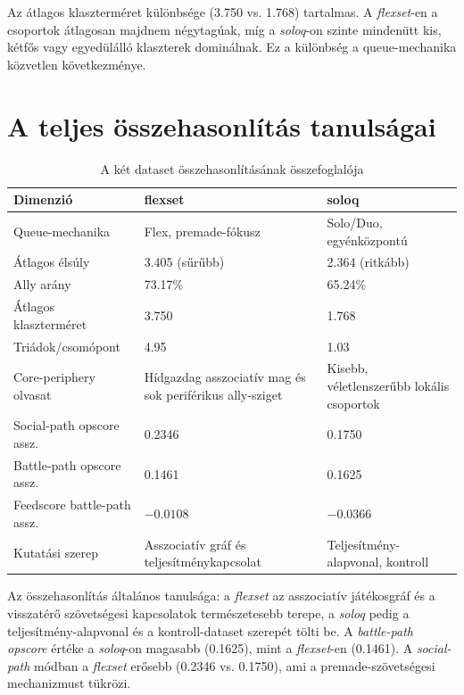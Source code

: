 Az átlagos klaszterméret különbsége (3.750 vs. 1.768) tartalmas. A \textit{flexset}-en a csoportok átlagosan majdnem négytagúak, míg a \textit{soloq}-on szinte mindenütt kis, kétfős vagy egyedülálló klaszterek dominálnak. Ez a különbség a queue-mechanika közvetlen következménye.

\section{A teljes összehasonlítás tanulságai}

\begin{table}[H]
\centering
\caption{A két dataset összehasonlításának összefoglalója}
\begin{tabularx}{\textwidth}{>{\raggedright\arraybackslash}p{5cm} X X}
\toprule
\textbf{Dimenzió} & \textbf{flexset} & \textbf{soloq} \\
\midrule
Queue-mechanika & Flex, premade-fókusz & Solo/Duo, egyénközpontú \\
Átlagos élsúly & 3.405 (sűrűbb) & 2.364 (ritkább) \\
Ally arány & 73.17\% & 65.24\% \\
Átlagos klaszterméret & 3.750 & 1.768 \\
Triádok/csomópont & 4.95 & 1.03 \\
Core-periphery olvasat & Hídgazdag asszociatív mag és sok periférikus ally-sziget & Kisebb, véletlenszerűbb lokális csoportok \\
Social-path opscore assz. & 0.2346 & 0.1750 \\
Battle-path opscore assz. & 0.1461 & 0.1625 \\
Feedscore battle-path assz. & $-0.0108$ & $-0.0366$ \\
Kutatási szerep & Asszociatív gráf és teljesítménykapcsolat & Teljesítmény-alapvonal, kontroll \\
\bottomrule
\end{tabularx}
\end{table}

Az összehasonlítás általános tanulsága: a \textit{flexset} az asszociatív játékosgráf és a visszatérő szövetségesi kapcsolatok természetesebb terepe, a \textit{soloq} pedig a teljesítmény-alapvonal és a kontroll-dataset szerepét tölti be. A \textit{battle-path opscore} értéke a \textit{soloq}-on magasabb (0.1625), mint a \textit{flexset}-en (0.1461). A \textit{social-path} módban a \textit{flexset} erősebb (0.2346 vs. 0.1750), ami a premade-szövetségesi mechanizmust tükrözi.

